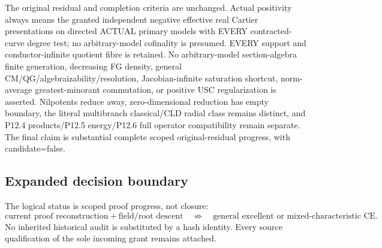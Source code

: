 The original residual and completion criteria are unchanged. Actual positivity always means the granted independent negative effective real Cartier presentations on directed ACTUAL primary models with EVERY contracted-curve degree test; no arbitrary-model cofinality is presumed. EVERY support and conductor-infinite quotient fibre is retained. No arbitrary-model section-algebra finite generation, decreasing FG density, general CM/QG/algebraizability/resolution, Jacobian-infinite saturation shortcut, norm-average greatest-minorant commutation, or positive USC regularization is asserted. Nilpotents reduce away, zero-dimensional reduction has empty boundary, the literal multibranch classical/CLD radial class remains distinct, and P12.4 products/P12.5 energy/P12.6 full operator compatibility remain separate. The final claim is substantial complete scoped original-residual progress, with candidate=false.

\subsection*{Expanded decision boundary}
The logical status is scoped proof progress, not closure:
\[
 \text{current proof reconstruction} + \text{field/root descent}
 \quad\not\Longrightarrow\quad
 \text{general excellent or mixed-characteristic CE}.
\]
No inherited historical audit is substituted by a hash identity. Every
source qualification of the sole incoming grant remains attached.

